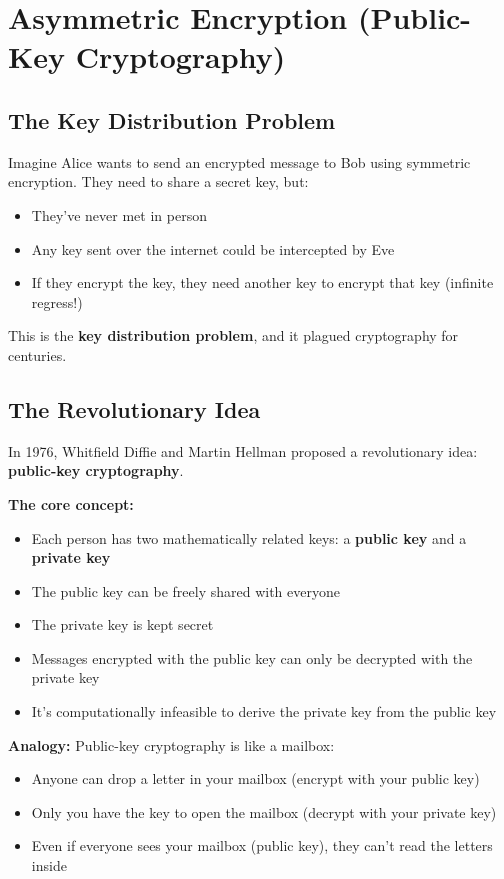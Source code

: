 \documentclass[11pt,a4paper]{report}
\begin{document}
\chapter{Asymmetric Encryption (Public-Key Cryptography)}

\section{The Key Distribution Problem}

Imagine Alice wants to send an encrypted message to Bob using symmetric encryption. They need to share a secret key, but:
\begin{itemize}
\item They've never met in person
\item Any key sent over the internet could be intercepted by Eve
\item If they encrypt the key, they need another key to encrypt that key (infinite regress!)
\end{itemize}

This is the \textbf{key distribution problem}, and it plagued cryptography for centuries.

\section{The Revolutionary Idea}

In 1976, Whitfield Diffie and Martin Hellman proposed a revolutionary idea: \textbf{public-key cryptography}.

\textbf{The core concept:}
\begin{itemize}
\item Each person has two mathematically related keys: a \textbf{public key} and a \textbf{private key}
\item The public key can be freely shared with everyone
\item The private key is kept secret
\item Messages encrypted with the public key can only be decrypted with the private key
\item It's computationally infeasible to derive the private key from the public key
\end{itemize}

\textbf{Analogy:} Public-key cryptography is like a mailbox:
\begin{itemize}
\item Anyone can drop a letter in your mailbox (encrypt with your public key)
\item Only you have the key to open the mailbox (decrypt with your private key)
\item Even if everyone sees your mailbox (public key), they can't read the letters inside
\end{itemize}
\end{document}
